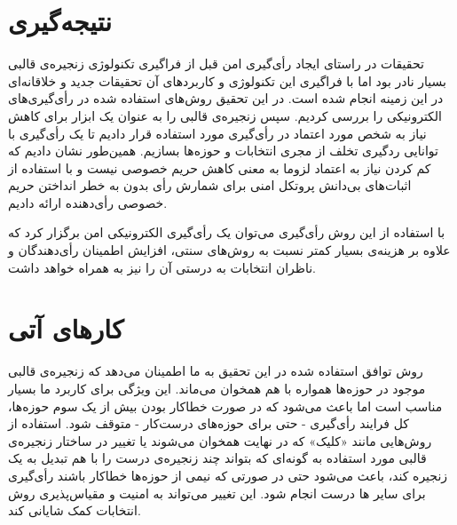 \section{نتیجه‌گیری}
تحقیقات در راستای ایجاد رأی‌گیری امن قبل از فراگیری تکنولوژی زنجیره‌ی قالبی بسیار نادر بود اما با فراگیری این تکنولوژی و کاربرد‌های آن تحقیقات جدید و خلاقانه‌ای در این زمینه انجام شده است. در این تحقیق روش‌های استفاده شده در رأی‌گیری‌های الکترونیکی را بررسی کردیم. سپس زنجیره‌ی قالبی را به عنوان یک ابزار برای کاهش نیاز به شخص مورد اعتماد در رأی‌گیری مورد استفاده قرار دادیم تا یک رأی‌گیری با توانایی ردگیری تخلف از مجری انتخابات و حوزه‌ها بسازیم. همین‌طور نشان دادیم که کم کردن نیاز به اعتماد لزوما به معنی کاهش حریم خصوصی نیست و با استفاده از اثبات‌های بی‌دانش پروتکل‌ امنی برای شمارش رأی بدون به خطر انداختن حریم خصوصی رأی‌دهنده ارائه دادیم. 
\par 
با استفاده از این روش رأی‌گیری می‌توان یک رأی‌گیری الکترونیکی امن برگزار کرد که علاوه بر هزینه‌ی بسیار کمتر نسبت به روش‌های سنتی، افزایش اطمینان رأی‌دهندگان و ناظران انتخابات به درستی آن را نیز به همراه خواهد داشت. 

\section{کار‌های آتی} 
روش توافق استفاده شده در این تحقیق به ما اطمینان می‌دهد که زنجیره‌ی قالبی موجود در حوزه‌ها همواره با هم همخوان می‌ماند. این ویژگی برای کاربرد ما بسیار مناسب است اما باعث می‌شود که در صورت خطاکار بودن بیش از یک سوم حوزه‌‌ها، کل فرایند رأی‌گیری - حتی برای حوزه‌های درست‌کار - متوقف شود. استفاده از روش‌هایی مانند «کلیک» که در نهایت همخوان می‌شوند یا تغییر در ساختار زنجیره‌ی قالبی مورد استفاده به گونه‌ای که بتواند چند زنجیره‌ی درست را با هم تبدیل به یک زنجیره کند، باعث می‌شود حتی در صورتی که نیمی از حوزه‌ها خطاکار باشند رأی‌گیری برای ‌سایر ‌‌ها درست انجام شود. این تغییر می‌تواند به امنیت و مقیاس‌پذیری روش انتخابات کمک شایانی کند. 





